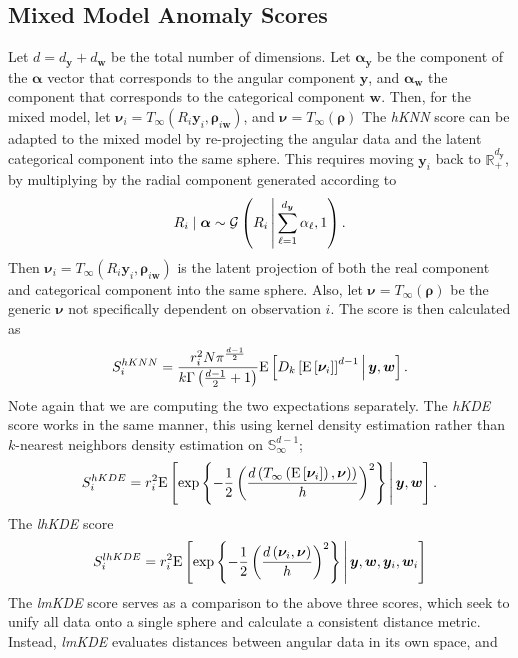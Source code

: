 \subsection{Mixed Model Anomaly Scores\label{sec:mixedscores}}
Let $d = d_{\bm{y}} + d_{\bm{w}}$ be the total number of dimensions.  
    Let $\bm{\alpha}_{\bm{y}}$ be the component of the $\bm{\alpha}$ vector that corresponds 
    to the angular component $\bm{y}$, and $\bm{\alpha}_{\bm{w}}$ the component that 
    corresponds to the categorical component $\bm{w}$.
    Then, for the mixed model, let $\bm{\nu}_i = T_{\infty}(R_i\bm{y}_i, \bm{\rho}_{i\bm{w}})$,
    and $\bm{\nu} = T_{\infty}(\bm{\rho})$
    The \emph{hKNN} score can be adapted to the mixed model by re-projecting the angular 
    data and the latent categorical component into the same sphere. This requires moving
    $\bm{y}_i$ back to $\mathbb{R}_+^{d_{\bm{y}}}$, by multiplying by the radial component
    generated according to
    \[
        R_i\mid\bm{\alpha} \sim \mathcal{G}
        \left(R_i\,\middle\vert\,\sum_{\ell = 1}^{d_{\bm{y}}}\alpha_{\ell}, 1\right).
    \]
    Then $\bm{\nu}_i = T_{\infty}(R_i\bm{y}_i, \bm{\rho}_{i\bm{w}})$ is the latent 
    projection of both the real component and categorical component into the same sphere.  
    Also, let $\bm{\nu} = T_{\infty}(\bm{\rho})$ be the generic $\bm{\nu}$ not specifically
    dependent on observation $i$.  The score is then calculated as
    \[
    S_i^{hKNN} = \frac{r_i^2 N\pi^{\frac{d-1}{2}}}{k\Gamma\left(\frac{d-1}{2} + 1\right)}
    \text{E}\left[D_{k}\left[\text{E}\left[\bm{\nu}_i\right]\right]^{d-1}\,\middle\vert\,\bm{y},\bm{w}\right].
    \]
    Note again that we are computing the two expectations separately.  The \emph{hKDE} 
    score works in the same manner, this using kernel density estimation rather than 
    $k$-nearest neighbors density estimation on $\mathbb{S}_{\infty}^{d-1}$;
    \[
    S_i^{hKDE} = r_i^2 \text{E}\left[\exp\left\lbrace -\frac{1}{2}
        \left(
        \frac{d\left(T_{\infty}\left(\text{E}\left[\bm{\nu}_i\right]\right), \bm{\nu})\right)}{h}
        \right)^2
        \right\rbrace \,\middle\vert\, \bm{y},\bm{w}
        \right].
    \]
    The \emph{lhKDE} score 
    \[
    S_i^{lhKDE} = r_i^2 \text{E}\left[\exp\left\lbrace-\frac{1}{2}\left(
        \frac{d\left(\bm{\nu}_i, \bm{\nu}\right)}{h}\right)^2\right\rbrace
        \,\middle\vert\, \bm{y},\bm{w},\bm{y}_i,\bm{w}_i\right]
    \]
    The \emph{lmKDE} score serves as a comparison to the above three scores, which seek 
    to unify all data onto a single sphere and calculate a consistent distance metric.  
    Instead, \emph{lmKDE} evaluates distances between angular data in its own space, and 
